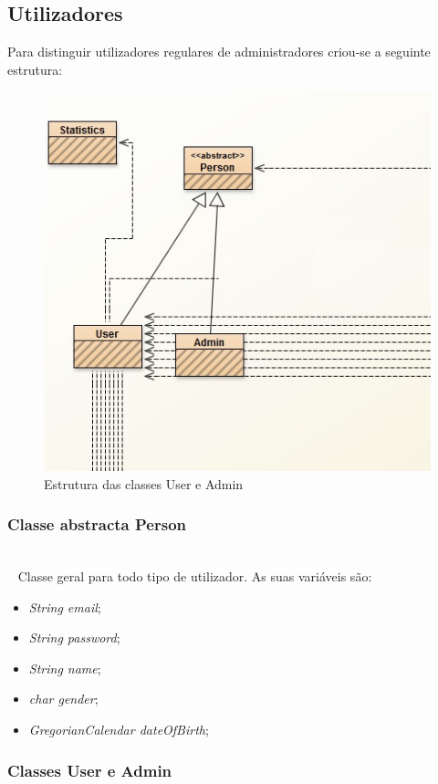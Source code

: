 \documentclass[10pt,notitlepage]{article}
\begin{document}
\subsection{Utilizadores}
Para distinguir utilizadores regulares de administradores criou-se a seguinte estrutura:
~\\
\begin{figure}[htb]
\centering
\includegraphics[scale=0.6]{Statsfinal.jpg}
\caption{Estrutura das classes User e Admin}
\end{figure}


\subsubsection{Classe abstracta Person}

~\\~
Classe geral para todo tipo de utilizador. As suas variáveis são:
\begin{itemize}
\item \textit{String email};
\item \textit{String password};
\item \textit{String name};
\item \textit{char gender};
\item \textit{GregorianCalendar dateOfBirth};
\end{itemize}

\subsubsection{Classes User e Admin}
\end{document}
